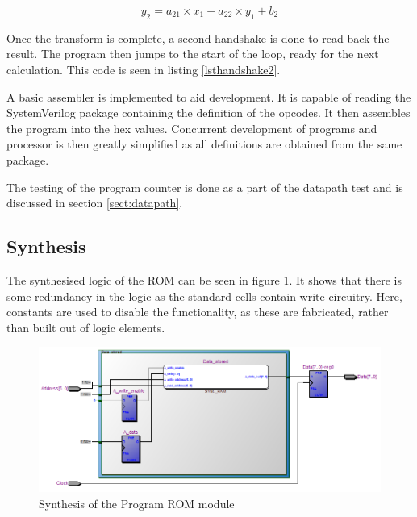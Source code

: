 \begin{equation}\label{eq:y2}
y_2 = a_{21} \times x_1 + a_{22} \times y_1 + b_2
\end{equation}





Once the transform is complete, a second handshake is done to read back the result. 
The program then jumps to the start of the loop, ready for the next calculation. 
This code is seen in listing \ref{lsthandshake2}.
\newpage



A basic assembler is implemented to aid development.
It is capable of reading the SystemVerilog package containing the definition of the opcodes.
It then assembles the program into the hex values. 
Concurrent development of programs and processor is then greatly simplified as all definitions are obtained from the same package.


The testing of the program counter is done as a part of the datapath test and is discussed in section \ref{sect:datapath}.
\subsection{Synthesis}

The synthesised logic of the ROM can be seen in figure \ref{fig:ramsynth}.
It shows that there is some redundancy in the logic as the standard cells contain write circuitry.
Here, constants are used to disable the functionality, as these are fabricated, rather than built out of logic elements.


\begin{figure}
\includegraphics[width=\textwidth]{Figures/ramsynth.png}
\caption{Synthesis of the Program ROM module}
\label{fig:ramsynth}
\end{figure}
